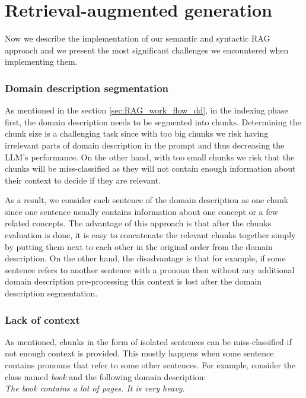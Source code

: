 \section{Retrieval-augmented generation}
\label{sec:rag_implementation}

Now we describe the implementation of our semantic and syntactic RAG approach and we present the most significant challenges we encountered when implementing them.


\subsubsection{Domain description segmentation}

As mentioned in the section \ref{sec:RAG_work_flow_dd}, in the indexing phase first, the domain description needs to be segmented into chunks. Determining the chunk size is a challenging task since with too big chunks we risk having irrelevant parts of domain description in the prompt and thus decreasing the LLM's performance. On the other hand, with too small chunks we risk that the chunks will be miss-classified as they will not contain enough information about their context to decide if they are relevant.

As a result, we consider each sentence of the domain description as one chunk since one sentence usually contains information about one concept or a few related concepts. The advantage of this approach is that after the chunks evaluation is done, it is easy to concatenate the relevant chunks together simply by putting them next to each other in the original order from the domain description. On the other hand, the disadvantage is that for example, if some sentence refers to another sentence with a pronoun then without any additional domain description pre-processing this context is lost after the domain description segmentation.


\subsubsection{Lack of context}

As mentioned, chunks in the form of isolated sentences can be miss-classified if not enough context is provided. This mostly happens when some sentence contains pronouns that refer to some other sentences. For example, consider the class named \textit{book} and the following domain description: \\

\noindent{}\textit{The book contains a lot of pages. It is very heavy.} \\

